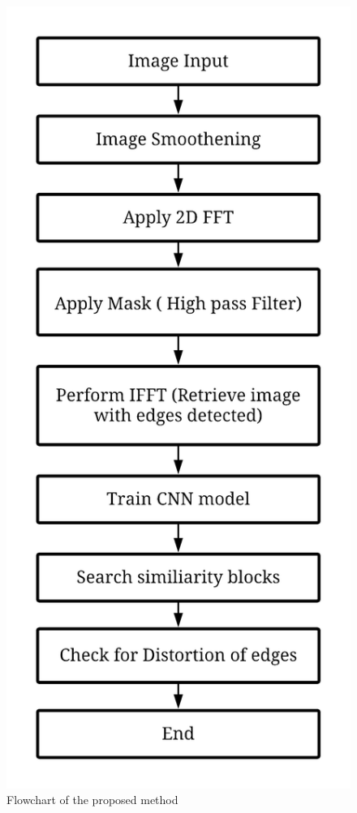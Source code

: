 \documentclass[conference]{IEEEtran}
\begin{document}
\begin{figure}[htpb]
\centerline{\includegraphics[scale=0.17]{block diagram-2.png}}
\caption{Flowchart of the proposed method}
\label{flowchart}
\end{figure}
\end{document}
